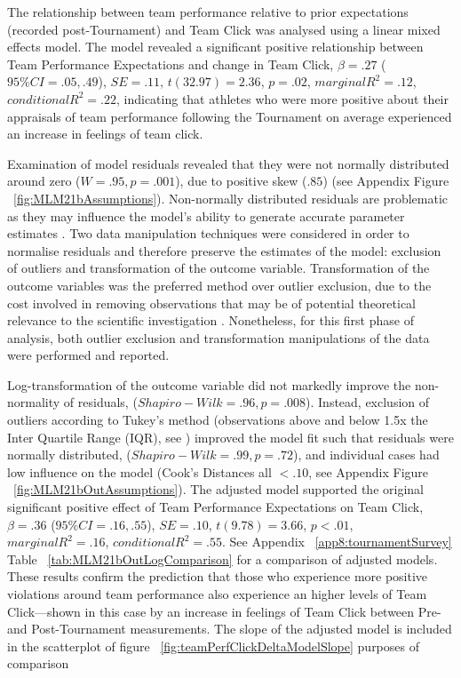 \begin{CJK}{UTF8}{gbsn}
The relationship between team performance relative to prior expectations (recorded post-Tournament) and Team Click was analysed using a linear mixed effects model. The model revealed a significant positive relationship between Team Performance Expectations and change in Team Click,  $\beta = .27$ ($95\% CI =  .05, .49$), $SE = .11$, $t(32.97) = 2.36$, $p = .02$, $marginal R^2 = .12$, $conditional R^2 = .22$, indicating that athletes who were more positive about their appraisals of team performance following the Tournament on average experienced an increase in feelings of team click.

Examination of model residuals revealed that they were not normally distributed around zero ($W = .95, p = .001$), due to positive skew ($.85$) (see Appendix Figure ~\ref{fig:MLM21bAssumptions}).  Non-normally distributed residuals are problematic as they may influence the model's ability to generate accurate parameter estimates . Two data manipulation techniques were considered in order to normalise residuals and therefore preserve the estimates of the model: exclusion of outliers and transformation of the outcome variable.  Transformation of the outcome variables was the preferred method over outlier exclusion, due to the cost involved in removing observations that may be of potential theoretical relevance to the scientific investigation \citep{Rousseeuw2011}. Nonetheless, for this first phase of analysis, both outlier exclusion and transformation manipulations of the data were performed and reported.

Log-transformation of the outcome variable did not markedly improve the non-normality of residuals, ($Shapiro-Wilk = .96, p = .008$).  Instead, exclusion of outliers according to Tukey's method (observations above and below 1.5x the Inter Quartile Range (IQR), see \citep{Tukey1977}) improved the model fit such that residuals were normally distributed, ($Shapiro-Wilk = .99, p = .72$), and individual cases had low influence on the model (Cook's Distances all $< .10$, see Appendix Figure ~\ref{fig:MLM21bOutAssumptions}).
The adjusted model supported the original significant positive effect of Team Performance Expectations on Team Click, $\beta = .36$ ($95\% CI =  .16, .55$), $SE = .10$, $t(9.78) = 3.66$, $p < .01$, $marginal R^2 = .16$, $conditional R^2 = .55$.
See Appendix ~\ref{app8:tournamentSurvey} Table ~\ref{tab:MLM21bOutLogComparison} for a comparison of adjusted models. These results confirm the prediction that those who experience more positive violations around team performance also experience an higher levels of Team Click---shown in this case by an increase in feelings of Team Click between Pre- and Post-Tournament measurements.  The slope of the adjusted model is included in the scatterplot of figure ~\ref{fig:teamPerfClickDeltaModelSlope} purposes of comparison


\end{CJK}
